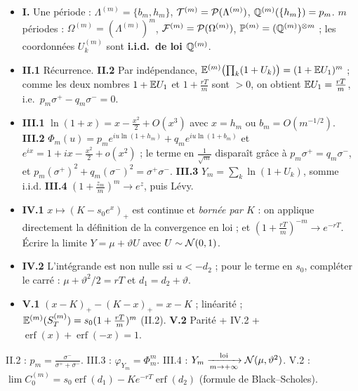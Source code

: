 \documentclass[11pt,a4paper]{article}
\begin{document}
\begin{exo}
\indic
\begin{itemize}
  \item \textbf{I.} Une période : $\Lambda^{(m)}=\{b_m,h_m\}$, $\mathcal{T}^{(m)}=\mathcal{P}(\Lambda^{(m)})$, $\mathbb{Q}^{(m)}(\{h_m\})=p_m$.
  $m$ périodes : $\Omega^{(m)}=(\Lambda^{(m)})^m$, $\mathcal{F}^{(m)}=\mathcal{P}(\Omega^{(m)})$, $\mathbb{P}^{(m)}=(\mathbb{Q}^{(m)})^{\otimes m}$ ; les coordonnées $U^{(m)}_k$ sont
  \textbf{i.i.d.\ de loi $\mathbb{Q}^{(m)}$}.
  \item \textbf{II.1} Récurrence. \textbf{II.2} Par indépendance, $\mathbb{E}^{(m)}\bigl(\prod_k(1+U_k)\bigr)=(1+\mathbb{E} U_1)^m$ ; comme les deux nombres
  $1+\mathbb{E} U_1$ et $1+\frac{rT}m$ sont $>0$, on obtient $\mathbb{E} U_1=\frac{rT}m$, i.e.\ $p_m\sigma^+-q_m\sigma^-=0$.
  \item \textbf{III.1} $\ln(1+x)=x-\frac{x^2}2+O(x^3)$ avec $x=h_m$ ou $b_m=O(m^{-1/2})$.
  \textbf{III.2} $\Phi_m(u)=p_me^{iu\ln(1+h_m)}+q_me^{iu\ln(1+b_m)}$ et $e^{ix}=1+ix-\frac{x^2}2+o(x^2)$ ; le terme en $\frac1{\sqrt m}$ disparaît grâce à
  $p_m\sigma^+=q_m\sigma^-$, et $p_m(\sigma^+)^2+q_m(\sigma^-)^2=\sigma^+\sigma^-$.
  \textbf{III.3} $Y_m=\sum_k\ln(1+U_k)$, somme i.i.d. \textbf{III.4} $(1+\frac{z_m}m)^m\to e^z$, puis Lévy.
  \item \textbf{IV.1} $x\mapsto(K-s_0e^x)_+$ est continue et \emph{bornée par $K$} : on applique directement la définition de la convergence en loi ;
  et $(1+\frac{rT}m)^{-m}\to e^{-rT}$. Écrire la limite $Y=\mu+\vartheta U$ avec $U\sim\mathcal{N}(0,1)$.
  \item \textbf{IV.2} L'intégrande est non nulle ssi $u<-d_2$ ; pour le terme en $s_0$, compléter le carré : $\mu+\vartheta^2/2=rT$ et
  $d_1=d_2+\vartheta$.
  \item \textbf{V.1} $(x-K)_+-(K-x)_+=x-K$ ; linéarité ; $\mathbb{E}^{(m)}(S^{(m)}_T)=s_0(1+\frac{rT}m)^m$ (II.2).
  \textbf{V.2} Parité + IV.2 + $\operatorname{erf}(x)+\operatorname{erf}(-x)=1$.
\end{itemize}

\rep II.2 : $p_m=\frac{\sigma^-}{\sigma^++\sigma^-}$. III.3 : $\varphi_{Y_m}=\Phi_m^m$. III.4 : $Y_m\xrightarrow[m\to+\infty]{\text{loi}}\mathcal{N}(\mu,\vartheta^2)$.
V.2 : $\lim C_0^{(m)}=s_0\operatorname{erf}(d_1)-Ke^{-rT}\operatorname{erf}(d_2)$ (formule de Black--Scholes).
\end{exo}
\end{document}
